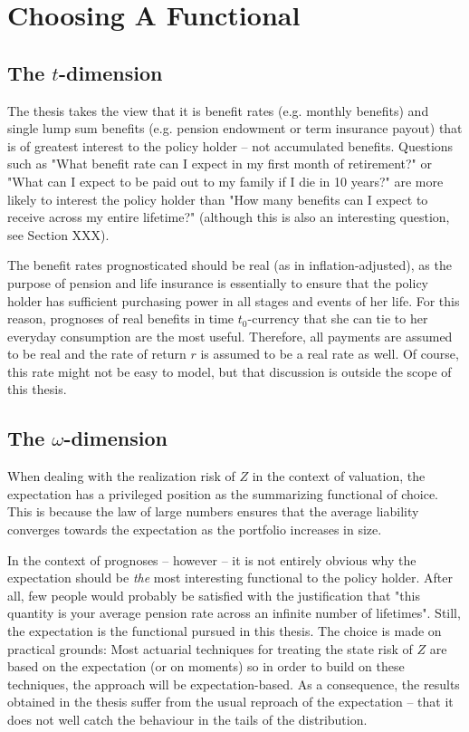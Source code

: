 \documentclass{book}
\newcommand{\1}[1]{\mathbbm{1}_{\left\lbrace #1 \right\rbrace}}
\theoremstyle{break}
\theoremstyle{remark}
\numberwithin{equation}{section}
\begin{document}
\section{Choosing A Functional}

\subsection{The $t$-dimension}

The thesis takes the view that it is benefit rates (e.g. monthly benefits) and single lump sum benefits (e.g. pension endowment or term insurance payout) that is of greatest interest to the policy holder -- not accumulated benefits. Questions such as "What benefit rate can I expect in my first month of retirement?" or "What can I expect to be paid out to my family if I die in 10 years?" are more likely to interest the policy holder than "How many benefits can I expect to receive across my entire lifetime?" (although this is also an interesting question, see Section XXX).

The benefit rates prognosticated should be real (as in inflation-adjusted), as the purpose of pension and life insurance is essentially to ensure that the policy holder has sufficient purchasing power in all stages and events of her life. For this reason, prognoses of real benefits in time $t_0$-currency that she can tie to her everyday consumption are the most useful. Therefore, all payments are assumed to be real and the rate of return $r$ is assumed to be a real rate as well. Of course, this rate might not be easy to model, but that discussion is outside the scope of this thesis.

\subsection{The $\omega$-dimension}

When dealing with the realization risk of $Z$ in the context of valuation, the expectation has a privileged position as the summarizing functional of choice. This is because the law of large numbers ensures that the average liability converges towards the expectation as the portfolio increases in size.

In the context of prognoses -- however -- it is not entirely obvious why the expectation should be \textit{the} most interesting functional to the policy holder. After all, few people would probably be satisfied with the justification that "this quantity is your average pension rate across an infinite number of lifetimes". Still, the expectation is the functional pursued in this thesis. The choice is made on practical grounds: Most actuarial techniques for treating the state risk of $Z$ are based on the expectation (or on moments) so in order to build on these techniques, the approach will be expectation-based. As a consequence, the results obtained in the thesis suffer from the usual reproach of the expectation -- that it does not well catch the behaviour in the tails of the distribution.
\end{document}
